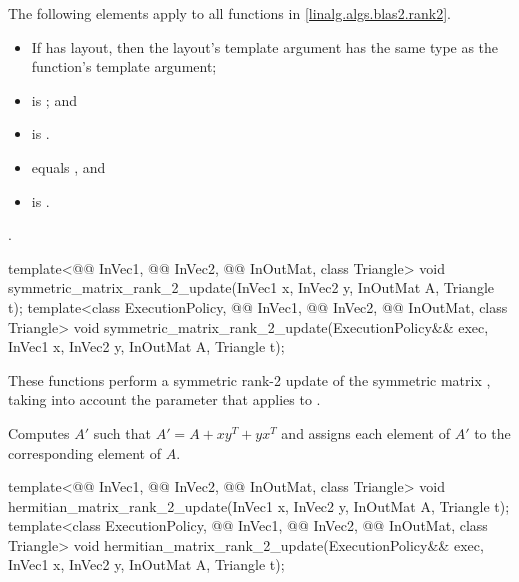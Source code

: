 \pnum
The following elements apply to all functions in \ref{linalg.algs.blas2.rank2}.

\pnum
\mandates
\begin{itemize}
\item
If  has  layout,
then the layout's  template argument has
the same type as the function's  template argument;
\item
{}
is ; and
\item
{}
is .
\end{itemize}

\pnum
\expects
\begin{itemize}
\item
{} equals , and
\item
{} is .
\end{itemize}

\pnum
\complexity
{}.

%
\begin{itemdecl}
template<@@ InVec1, @@ InVec2,
         @@ InOutMat, class Triangle>
  void symmetric_matrix_rank_2_update(InVec1 x, InVec2 y, InOutMat A, Triangle t);
template<class ExecutionPolicy, @@ InVec1, @@ InVec2,
         @@ InOutMat, class Triangle>
  void symmetric_matrix_rank_2_update(ExecutionPolicy&& exec,
                                      InVec1 x, InVec2 y, InOutMat A, Triangle t);
\end{itemdecl}

\begin{itemdescr}
\pnum
These functions perform
a symmetric rank-2 update of the symmetric matrix ,
taking into account the  parameter
that applies to .

\pnum
\effects
Computes $A'$ such that $A' = A + x y^T + y x^T$ and
assigns each element of $A'$ to the corresponding element of $A$.
\end{itemdescr}

%
\begin{itemdecl}
template<@@ InVec1, @@ InVec2,
         @@ InOutMat, class Triangle>
  void hermitian_matrix_rank_2_update(InVec1 x, InVec2 y, InOutMat A, Triangle t);
template<class ExecutionPolicy, @@ InVec1, @@ InVec2,
         @@ InOutMat, class Triangle>
  void hermitian_matrix_rank_2_update(ExecutionPolicy&& exec,
                                      InVec1 x, InVec2 y, InOutMat A, Triangle t);
\end{itemdecl}


